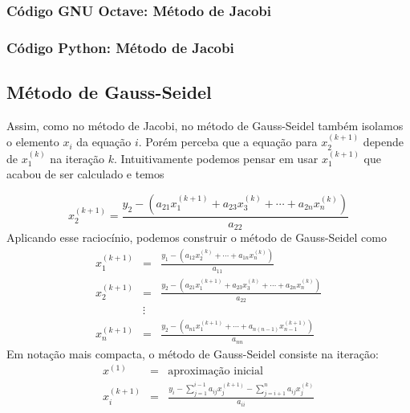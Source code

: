 
\fi
\ifisoctave
\subsubsection{Código GNU Octave: Método de Jacobi}


\fi
\ifispython
\subsubsection{Código Python: Método de Jacobi}


\fi

\subsection{Método de Gauss-Seidel}

Assim, como no método de Jacobi, no método de Gauss-Seidel também isolamos o elemento $x_i$ da equação $i$. Porém perceba que a equação para $x_2^{(k+1)}$ depende de $x_1^{(k)}$ na iteração $k$. Intuitivamente podemos pensar em usar $x_1^{(k+1)}$ que acabou de ser calculado e temos

\begin{equation*}
x_2^{(k+1)} =\frac{y_2 - \left(a_{21}x_1^{(k+1)}+a_{23}x_3^{(k)}+\cdots+a_{2n}x_n^{(k)}\right)}{a_{22}}
\end{equation*}
Aplicando esse raciocínio, podemos construir o método de Gauss-Seidel como
\begin{eqnarray*}
x_1^{(k+1)}&=&\frac{y_1 - \left(a_{12}x_2^{(k)}+\cdots+a_{1n}x_n^{(k)}\right)}{a_{11}}\\
x_2^{(k+1)}&=&\frac{y_2 - \left(a_{21}x_1^{(k+1)}+a_{23}x_3^{(k)}+\cdots+a_{2n}x_n^{(k)}\right)}{a_{22}}\\
&\vdots&\\
x_n^{(k+1)}&=&\frac{y_2 - \left(a_{n1}x_1^{(k+1)}+\cdots+a_{n(n-1)}x_{n-1}^{(k+1)}\right)}{a_{nn}}
\end{eqnarray*}
Em notação mais compacta, o método de Gauss-Seidel consiste na iteração:
\begin{eqnarray*}
  x^{(1)} &=& \text{aproximação inicial}\\
  x_i^{(k+1)} &=& \frac{y_i - \sum_{j=1}^{i-1} a_{ij}x_j^{(k+1)} -\sum_{j=i+1}^{n} a_{ij}x_j^{(k)}}{a_{ii}}
\end{eqnarray*}

